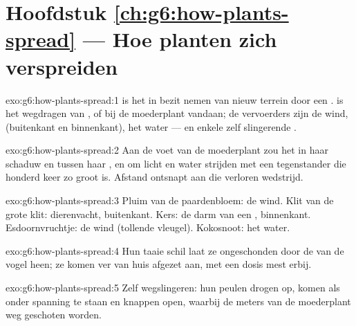 \section*{Hoofdstuk \ref{ch:g6:how-plants-spread} --- Hoe planten zich verspreiden}

\begin{solution}{exo:g6:how-plants-spread:1}
 is het in bezit nemen van nieuw terrein door een .
 is het wegdragen van ,  of  bij de
moederplant vandaan; de vervoerders zijn de wind,  (buitenkant en
binnenkant), het water --- en enkele zelf slingerende .
\end{solution}

\begin{solution}{exo:g6:how-plants-spread:2}
Aan de voet van de moederplant zou het in haar schaduw en tussen haar
 , en om licht en water strijden met een tegenstander die
honderd keer zo groot is. Afstand ontsnapt aan die verloren wedstrijd.
\end{solution}

\begin{solution}{exo:g6:how-plants-spread:3}
Pluim van de paardenbloem: de wind. Klit van de grote klit: dierenvacht,
buitenkant. Kers: de darm van een , binnenkant. Esdoornvruchtje: de
wind (tollende vleugel). Kokosnoot: het water.
\end{solution}

\begin{solution}{exo:g6:how-plants-spread:4}
Hun taaie schil laat ze ongeschonden door de  van de vogel heen;
ze komen ver van huis afgezet aan, met een dosis mest erbij.
\end{solution}

\begin{solution}{exo:g6:how-plants-spread:5}
Zelf wegslingeren: hun peulen drogen op, komen als  onder spanning
te staan en knappen open, waarbij de  meters van de moederplant weg
geschoten worden.
\end{solution}

